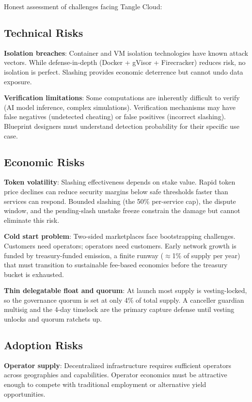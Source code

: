 \documentclass[11pt,a4paper]{article}
\begin{document}
Honest assessment of challenges facing Tangle Cloud:

\subsection{Technical Risks}

\textbf{Isolation breaches}: Container and VM isolation technologies have known attack vectors. While defense-in-depth (Docker + gVisor + Firecracker) reduces risk, no isolation is perfect. Slashing provides economic deterrence but cannot undo data exposure.

\textbf{Verification limitations}: Some computations are inherently difficult to verify (AI model inference, complex simulations). Verification mechanisms may have false negatives (undetected cheating) or false positives (incorrect slashing). Blueprint designers must understand detection probability for their specific use case.

\subsection{Economic Risks}

\textbf{Token volatility}: Slashing effectiveness depends on stake value. Rapid token price declines can reduce security margins below safe thresholds faster than services can respond. Bounded slashing (the 50\% per-service cap), the dispute window, and the pending-slash unstake freeze constrain the damage but cannot eliminate this risk.

\textbf{Cold start problem}: Two-sided marketplaces face bootstrapping challenges. Customers need operators; operators need customers. Early network growth is funded by treasury-funded emission, a finite runway ($\approx$1\% of supply per year) that must transition to sustainable fee-based economics before the treasury bucket is exhausted.

\textbf{Thin delegatable float and quorum}: At launch most supply is vesting-locked, so the governance quorum is set at only 4\% of total supply. A canceller guardian multisig and the 4-day timelock are the primary capture defense until vesting unlocks and quorum ratchets up.

\subsection{Adoption Risks}

\textbf{Operator supply}: Decentralized infrastructure requires sufficient operators across geographies and capabilities. Operator economics must be attractive enough to compete with traditional employment or alternative yield opportunities.
\end{document}
